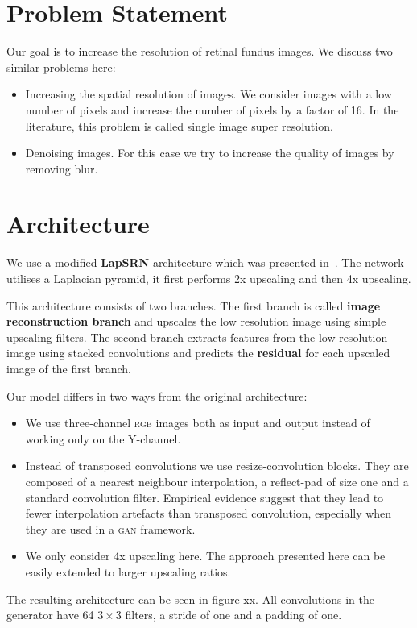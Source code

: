 \documentclass{scrartcl}
\begin{document}
\section{Problem Statement}
Our goal is to increase the resolution of retinal fundus images.
We discuss two similar problems here:
\begin{itemize}
\item Increasing the spatial resolution of images.
  We consider images with a low number of pixels and increase the number of pixels by a factor of 16.
  In the literature, this problem is called single image super resolution.
\item Denoising images.
  For this case we try to increase the quality of images by removing blur.
\end{itemize}


\section{Architecture}
We use a modified \textbf{LapSRN} architecture which was presented in~\cite{LapSRN}.
The network utilises a Laplacian pyramid, it first performs 2x upscaling and then 4x upscaling.

This architecture consists of two branches.
The first branch is called \textbf{image reconstruction branch} and upscales the low resolution image using simple upscaling filters.
The second branch extracts features from the low resolution image using stacked convolutions and predicts the \textbf{residual} for each upscaled image of the first branch.

Our model differs in two ways from the original architecture:
\begin{itemize}
\item We use three-channel \textsc{rgb} images both as input and output instead of working only on the Y-channel.
\item Instead of transposed convolutions we use resize-convolution blocks.
  They are composed of a nearest neighbour interpolation, a reflect-pad of size one and a standard convolution filter.
  Empirical evidence suggest that they lead to fewer interpolation artefacts than transposed convolution, especially when they are used in a \textsc{gan} framework\cite{deconvolution}.
\item We only consider 4x upscaling here.
  The approach presented here can be easily extended to larger upscaling ratios.
\end{itemize}
The resulting architecture can be seen in figure xx.
All convolutions in the generator have 64 $3 \times 3$ filters, a stride of one and a padding of one.
\end{document}
